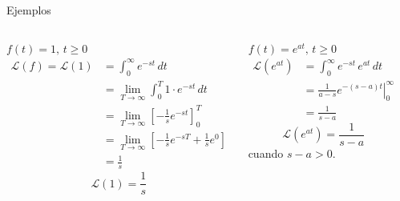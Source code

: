 \documentclass[9pt, aspectratio=169]{beamer}
\begin{document}
\begin{frame}{Ejemplos}
\begin{columns}[t]
\cx
$f(t) = 1, \, t \geq 0$
\begin{align*}
    \mathscr{L}(f) = \mathscr{L}(1) &= \int_0^{\infty} e^{-st} \, dt \\
&= \lim_{T \rightarrow \infty} \int_0^T 1 \cdot e^{-s t} \, dt \\
&= \lim_{T \rightarrow \infty} \left[ -\frac{1}{s} e^{-s t} \right]_0^T \\
&= \lim_{T \rightarrow \infty} \left[ -\frac{1}{s} e^{-s T} + \frac{1}{s} e^0 \right] \\
&= \frac{1}{s}
\end{align*}
\[ \boxed{ \mathscr{L}(1) = \frac{1}{s} } \]
\pause
 
\cx
$f(t) = e^{at}, \, t \geq 0$
\begin{align*}
    \mathscr{L} (e^{at}) &= \int_0^{\infty} e^{-st} \, e^{at} \, dt \\
                         &= \left. \frac{1}{a - s} e^{-(s-a)t} \right|_0^{\infty} \\
                         &= \frac{1}{s -a}
\end{align*}
\[ \boxed{ \mathscr{L}(e^{at}) = \frac{1}{s -a}} \]
cuando $s -a > 0$.
\end{columns}
\end{frame}
\end{document}
